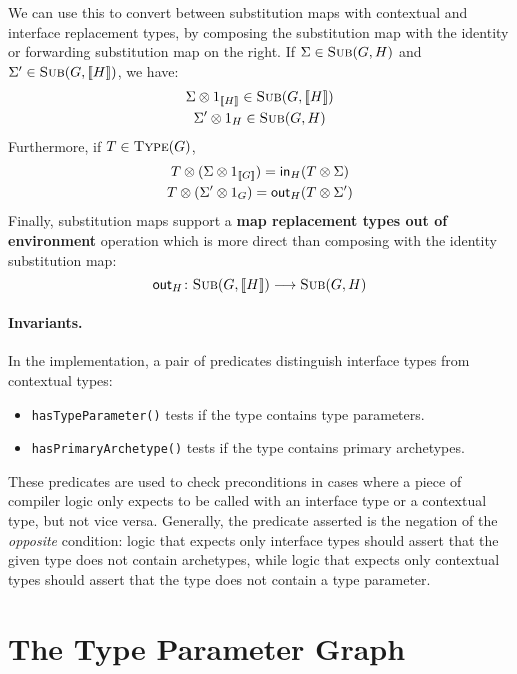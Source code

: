 \documentclass[../generics]{subfiles}
\begin{document}
We can use this to convert between substitution maps with contextual and interface replacement types, by composing the substitution map with the identity or forwarding substitution map on the right. If $\Sigma\in\textsc{Sub}({G, H})$ and $\Sigma^\prime\in\textsc{Sub}({G, [\![H]\!]})$, we have:
\begin{gather*}
\Sigma\otimes 1_{[\![H]\!]}\in\textsc{Sub}({G, [\![H]\!]})\\
\Sigma^\prime\otimes 1_H\in\textsc{Sub}({G, H})
\end{gather*}
Furthermore, if $T\in\textsc{Type}({G})$,
\begin{gather*}
T\otimes (\Sigma\otimes 1_{[\![G]\!]}) = \mathsf{in}_{H}(T\otimes \Sigma)\\
T\otimes (\Sigma^\prime \otimes 1_G) = \mathsf{out}_{H}(T\otimes \Sigma^\prime)
\end{gather*}
Finally, substitution maps support a \textbf{map replacement types out of environment} operation which is more direct than composing with the identity substitution map:
\[\mathsf{out}_H\colon\textsc{Sub}({G, [\![H]\!]})\longrightarrow\textsc{Sub}({G, H})\]

\paragraph{Invariants.} In the implementation, a pair of predicates distinguish interface types from contextual types:
\begin{itemize}
\item \texttt{hasTypeParameter()} tests if the type contains type parameters.
\item \texttt{hasPrimaryArchetype()} tests if the type contains primary archetypes.
\end{itemize}
These predicates are used to check preconditions in cases where a piece of compiler logic only expects to be called with an interface type or a contextual type, but not vice versa. Generally, the predicate asserted is the negation of the \emph{opposite} condition: logic that expects only interface types should assert that the given type does not contain archetypes, while logic that expects only contextual types should assert that the type does not contain a type parameter.

\section{The Type Parameter Graph}\label{type parameter graph}
\end{document}
